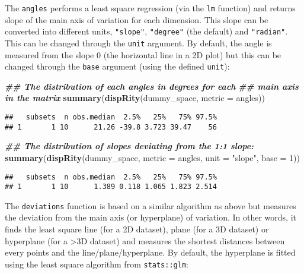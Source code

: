 \documentclass[
]{book}
\newenvironment{Shaded}{\begin{snugshade}}{\end{snugshade}}
\newcommand{\AttributeTok}[1]{\textcolor[rgb]{0.13,0.29,0.53}{#1}}
\newcommand{\DecValTok}[1]{\textcolor[rgb]{0.00,0.00,0.81}{#1}}
\newcommand{\DocumentationTok}[1]{\textcolor[rgb]{0.56,0.35,0.01}{\textbf{\textit{#1}}}}
\newcommand{\FunctionTok}[1]{\textcolor[rgb]{0.13,0.29,0.53}{\textbf{#1}}}
\newcommand{\NormalTok}[1]{#1}
\newcommand{\StringTok}[1]{\textcolor[rgb]{0.31,0.60,0.02}{#1}}
\begin{document}
The \texttt{angles} performs a least square regression (via the \texttt{lm} function) and returns slope of the main axis of variation for each dimension. This slope can be converted into different units, \texttt{"slope"}, \texttt{"degree"} (the default) and \texttt{"radian"}. This can be changed through the \texttt{unit} argument.
By default, the angle is measured from the slope 0 (the horizontal line in a 2D plot) but this can be changed through the \texttt{base} argument (using the defined \texttt{unit}):

\begin{Shaded}
\begin{Highlighting}[]
\DocumentationTok{\#\# The distribution of each angles in degrees for each}
\DocumentationTok{\#\# main axis in the matrix}
\FunctionTok{summary}\NormalTok{(}\FunctionTok{dispRity}\NormalTok{(dummy\_space, }\AttributeTok{metric =}\NormalTok{ angles))}
\end{Highlighting}
\end{Shaded}

\begin{verbatim}
##   subsets  n obs.median  2.5%   25%   75% 97.5%
## 1       1 10      21.26 -39.8 3.723 39.47    56
\end{verbatim}

\begin{Shaded}
\begin{Highlighting}[]
\DocumentationTok{\#\# The distribution of slopes deviating from the 1:1 slope:}
\FunctionTok{summary}\NormalTok{(}\FunctionTok{dispRity}\NormalTok{(dummy\_space, }\AttributeTok{metric =}\NormalTok{ angles, }\AttributeTok{unit =} \StringTok{"slope"}\NormalTok{,}
                 \AttributeTok{base =} \DecValTok{1}\NormalTok{))}
\end{Highlighting}
\end{Shaded}

\begin{verbatim}
##   subsets  n obs.median  2.5%   25%   75% 97.5%
## 1       1 10      1.389 0.118 1.065 1.823 2.514
\end{verbatim}

The \texttt{deviations} function is based on a similar algorithm as above but measures the deviation from the main axis (or hyperplane) of variation.
In other words, it finds the least square line (for a 2D dataset), plane (for a 3D dataset) or hyperplane (for a \textgreater3D dataset) and measures the shortest distances between every points and the line/plane/hyperplane.
By default, the hyperplane is fitted using the least square algorithm from \texttt{stats::glm}:
\end{document}

